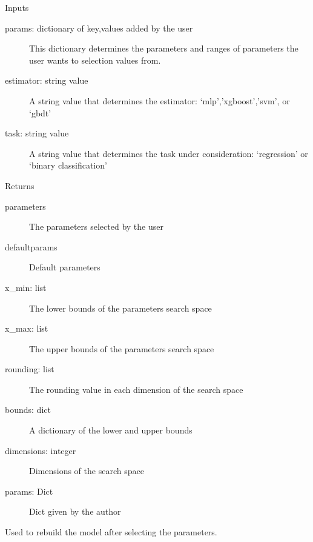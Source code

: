 \documentclass[letterpaper,10pt,english]{sphinxmanual}
\begin{document}
\begin{fulllineitems}
\begin{fulllineitems}
Inputs
\begin{description}
\item[{params: dictionary of key,values added by the user}] \leavevmode
This dictionary determines the parameters and ranges of parameters the user wants to selection values from.

\item[{estimator: string value}] \leavevmode
A string value that determines the estimator: ‘mlp’,’xgboost’,’svm’, or ‘gbdt’

\item[{task: string value}] \leavevmode
A string value that determines the task under consideration: ‘regression’ or ‘binary classification’

\end{description}

Returns
\begin{description}
\item[{parameters}] \leavevmode
The parameters selected by the user

\item[{defaultparams}] \leavevmode
Default parameters

\item[{x\_min: list}] \leavevmode
The lower bounds of the parameters search space

\item[{x\_max: list}] \leavevmode
The upper bounds of the parameters search space

\item[{rounding: list}] \leavevmode
The rounding value in each dimension of the search space

\item[{bounds: dict}] \leavevmode
A dictionary of the lower and upper bounds

\item[{dimensions: integer}] \leavevmode
Dimensions of the search space

\item[{params: Dict}] \leavevmode
Dict given by the author

\end{description}

\end{fulllineitems}


\begin{fulllineitems}
\label{\detokenize{index:pspso.pspso.rebuildmodel}}
Used to rebuild the model after selecting the parameters.

\end{fulllineitems}


\end{fulllineitems}
\end{document}
